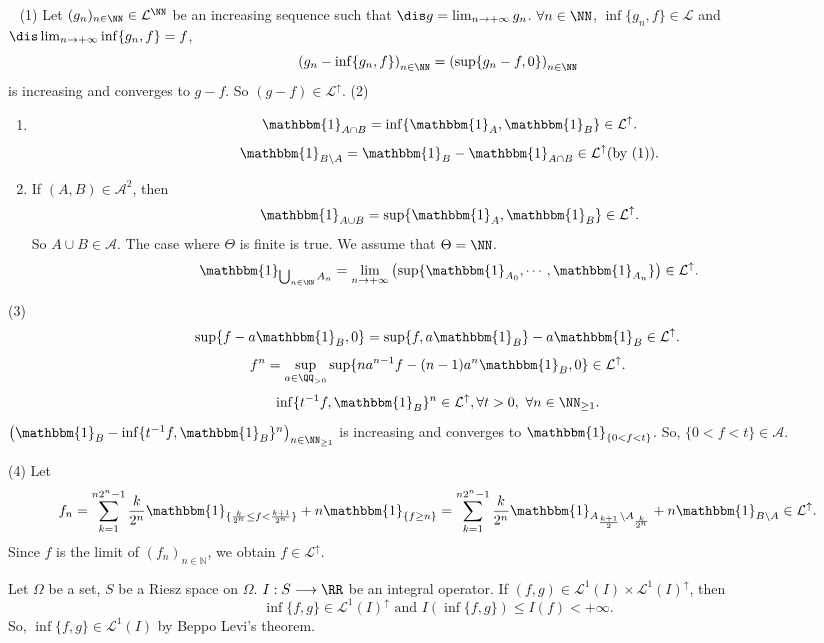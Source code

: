 \begin{proofenv}
    \ \newline
    (1) Let $(g_n)_{n\in\NN}\in \mathcal{L}^\NN$ be an increasing sequence such that $\dis g=\lim_{n\rightarrow +\infty}g_n$.
    $\forall n\in \NN$, $\inf\{g_n,f\}\in \mathcal{L}$ and $\dis \lim_{n\rightarrow+\infty}\inf\{g_n,f\}=f$,
    $$ \left(g_n-\inf\{g_n,f\}\right)_{n\in \NN}=\left(\sup\{g_n-f,0\}\right)_{n\in \NN}$$
    is increasing and converges to $g-f$. So $(g-f)\in \mathcal{L}^\uparrow$.
    \newline
    (2)
    \begin{enumerate}
        \item $$ \mathbbm{1}_{A\cap B}=\inf\{\mathbbm{1}_A,\mathbbm{1}_B\}\in \mathcal{L}^\uparrow.$$
            $$ \mathbbm{1}_{B\setminus A} =\mathbbm{1}_{B}-\mathbbm{1}_{A\cap B}\in \mathcal{L}^\uparrow (\text{by (1)}).$$
        \item If $(A,B)\in \mathcal{A}^2$, then
        $$ \mathbbm{1}_{A\cup B}=\sup\{\mathbbm{1}_{A}, \mathbbm{1}_{B}\}\in \mathcal{L}^\uparrow.$$
        So $A\cup B\in \mathcal{A}$. The case where $\Theta$ is finite is true.
        We assume that $\Theta=\NN$. 
        $$ \mathbbm{1}_{\bigcup_{n\in \NN}A_n} =\lim_{n\rightarrow +\infty} \left(\sup\{\mathbbm{1}_{A_0},\cdots,\mathbbm{1}_{A_n}\}\right)\in\mathcal{L}^\uparrow.$$
    \end{enumerate}
    (3) $$\sup\{f-a\mathbbm{1}_{B},0\}=\sup\{f,a\mathbbm{1}_B\}-a\mathbbm{1}_{B}\in \mathcal{L}^\uparrow.$$
        $$ f^n=\sup_{a\in \QQ_{>0}} \sup\{na^{n-1}f-(n-1)a^n\mathbbm{1}_{B},0\}\in \mathcal{L}^\uparrow.$$
        $$ \inf\{t^{-1}f, \mathbbm{1}_B\}^n \in \mathcal{L}^\uparrow, \forall t>0,\ \forall n\in \NN_{\ge 1}.$$
        $\left(\mathbbm{1}_{B}-\inf\{t^{-1}f,\mathbbm{1}_{B}\}^n\right)_{n\in \NN_{\ge 1}}$ is increasing and converges to $\mathbbm{1}_{\{0<f<t\}}$.
        So, $\{0<f<t\}\in \mathcal{A}$.

(4)
Let $$f_n = \sum_{k=1}^{n2^n-1} \frac{k}{2^n} \mathbbm{1}_{\{ \frac{k}{2^n} \leq f < \frac{k+1}{2^n} \}}+ n \mathbbm{1}_{\{ f \geq n \}}=\sum_{k=1}^{n2^n-1} \frac{k}{2^n} \mathbbm{1}_{A_{\frac{k+1}{2}}\setminus A_{\frac{k}{2^n}}} + n \mathbbm{1}_{B\setminus A}\in \mathcal{L}^\uparrow. $$
Since \( f \) is the limit of \( (f_n)_{n \in \mathbb{N}} \), we obtain \( f \in \mathcal{L}^\uparrow \).
\end{proofenv}
\begin{remark}
    Let $\Omega$ be a set, $S$ be a Riesz space on $\Omega$. $I: S\longrightarrow \RR$ be an integral operator.
    If $(f,g)\in \mathcal{L}^1(I)\times \mathcal{L}^{1}(I)^\uparrow$,
    then
    $$ \inf\{f,g\}\in \mathcal{L}^1(I)^{\uparrow}\text{ and } I\left(\inf\{f,g\}\right)\le I(f)<+\infty.$$
    So, $\inf\{f,g\}\in \mathcal{L}^{1}(I)$ by Beppo Levi's theorem.
\end{remark}
\newpage

